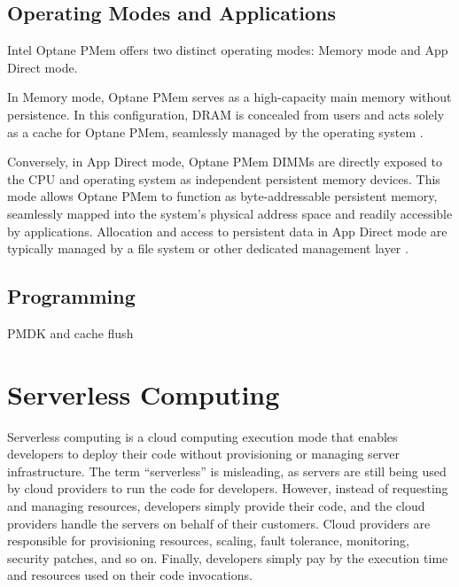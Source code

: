 \subsection{Operating Modes and Applications}

Intel Optane PMem offers two distinct operating modes: Memory mode and App Direct mode.

In Memory mode, Optane PMem serves as a high-capacity main memory without persistence. In this configuration, DRAM is concealed from users and acts solely as a cache for Optane PMem, seamlessly managed by the operating system \cite{yang2020empirical}.

Conversely, in App Direct mode, Optane PMem DIMMs are directly exposed to the CPU and operating system as independent persistent memory devices. This mode allows Optane PMem to function as byte-addressable persistent memory, seamlessly mapped into the system's physical address space and readily accessible by applications. Allocation and access to persistent data in App Direct mode are typically managed by a file system or other dedicated management layer \cite{yang2020empirical,WhyIsthe9:online}.

\subsection{Programming}
PMDK and cache flush


\section{Serverless Computing}

Serverless computing is a cloud computing execution mode that enables developers to deploy their code without provisioning or managing server infrastructure. The term “serverless” is misleading, as servers are still being used by cloud providers to run the code for developers. However, instead of requesting and managing resources, developers simply provide their code, and the cloud providers handle the servers on behalf of their customers. Cloud providers are responsible for provisioning resources, scaling, fault tolerance, monitoring, security patches, and so on. Finally, developers simply pay by the execution time and resources used on their code invocations.

